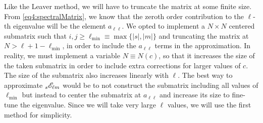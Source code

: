 Like the Leaver method, we will have to truncate the matrix at some finite size.
From \eqref{eq4:spectralMatrix}, we know that the zeroth order contribution to the $\ell$-th eigenvalue will be the element $a_{\ell\ell}$.
We opted to implement a $N\times N$ centered submatrix such that $i,j\ge\ell_\mathrm{\min}\equiv\max\{|s|,|m|\}$ and truncating the matrix at $N > \ell+1 - \ell_\mathrm{\min}$, in order to include the $a_{\ell\ell}$ terms in the approximation.
In reality, we must implement a variable $N\equiv N(c)$, so that it increases the size of the taken submatrix in order to include extra corrections for larger values of $c$.
The size of the submatrix also increases linearly with $\ell$.
The best way to approximate $\uu[s]{\mathscr{E}}{\ell m}$ would be to not construct the submatrix including all values of $\ell_\mathrm{\min}$ but instead to center the submatrix at $a_{\ell\ell}$ and increase its size to fine-tune the eigenvalue.
Since we will take very large $\ell$ values, we will use the first method for simplicity.


